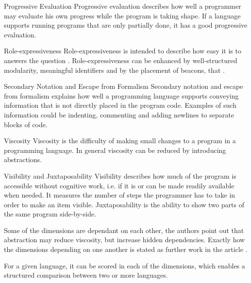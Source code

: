 \begin{labeling}{\quad\quad\quad}
\item[Progressive Evaluation] Progressive evaluation describes how well a programmer may evaluate his own progress while the program is taking shape. If a language supports running programs that are only partially done, it has a good progressive evaluation.
\item[Role-expressiveness] Role-expressiveness is intended to describe how easy it is to answers the question \textit{}. Role-expressiveness can be enhanced by well-structured modularity, meaningful identifiers and by the placement of beacons, that \textit{}.
\item[Secondary Notation and Escape from Formalism] Secondary notation and escape from formalism explains how well a programming language supports conveying information that is not directly placed in the program code. Examples of such information could be indenting, commenting and adding newlines to separate blocks of code.
\item[Viscosity] Viscosity is the difficulty of making small changes to a program in a programming language. In general viscosity can be reduced by introducing abstractions.
\item[Visibility and Juxtaposability] Visibility describes how much of the program is accessible without cognitive work, i.e. if it is or can be made readily available when needed. It measures the number of steps the programmer has to take in order to make an item visible. Juxtaposability is the ability to show two parts of the same program side-by-side.
\end{labeling}

Some of the dimensions are dependant on each other, the authors point out that abstraction may reduce viscosity, but increase hidden dependencies. Exactly how the dimensions depending on one another is stated as further work in the article \cite{green1996usability}.

For a given language, it can be scored in each of the dimensions, which enables a structured comparison between two or more languages.

